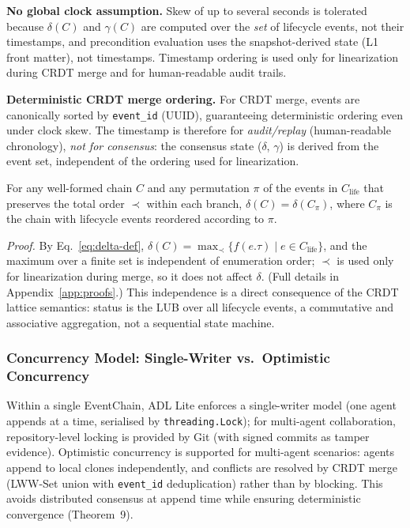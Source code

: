 \textbf{No global clock assumption.} Skew of up to several seconds is tolerated because $\delta(C)$ and $\gamma(C)$ are computed over the \emph{set} of lifecycle events, not their timestamps, and precondition evaluation uses the snapshot-derived state (L1 front matter), not timestamps. Timestamp ordering is used only for linearization during CRDT merge and for human-readable audit trails.

\textbf{Deterministic CRDT merge ordering.} For CRDT merge, events are canonically sorted by \texttt{event\_id} (UUID), guaranteeing deterministic ordering even under clock skew. The timestamp is therefore for \emph{audit/replay} (human-readable chronology), \emph{not for consensus}: the consensus state ($\delta$, $\gamma$) is derived from the event set, independent of the ordering used for linearization.

\begin{theorem}\label{thm:delta-independence}
For any well-formed chain $C$ and any permutation $\pi$ of the events in $C_{\text{life}}$ that preserves the total order $\prec$ within each branch, $\delta(C) = \delta(C_{\pi})$, where $C_{\pi}$ is the chain with lifecycle events reordered according to $\pi$.
\end{theorem}
\emph{Proof.} By Eq.~\ref{eq:delta-def}, $\delta(C) = \max_{\prec}\{ f(e.\tau) \mid e \in C_{\text{life}} \}$, and the maximum over a finite set is independent of enumeration order; $\prec$ is used only for linearization during merge, so it does not affect $\delta$. (Full details in Appendix~\ref{app:proofs}.) This independence is a direct consequence of the CRDT lattice semantics: status is the LUB over all lifecycle events, a commutative and associative aggregation, not a sequential state machine.

\subsubsection{Concurrency Model: Single-Writer vs.~Optimistic Concurrency}

Within a single EventChain, ADL Lite enforces a single-writer model (one agent appends at a time, serialised by \texttt{threading.Lock}); for multi-agent collaboration, repository-level locking is provided by Git (with signed commits as tamper evidence). Optimistic concurrency is supported for multi-agent scenarios: agents append to local clones independently, and conflicts are resolved by CRDT merge (LWW-Set union with \texttt{event\_id} deduplication) rather than by blocking. This avoids distributed consensus at append time while ensuring deterministic convergence (Theorem~9).

